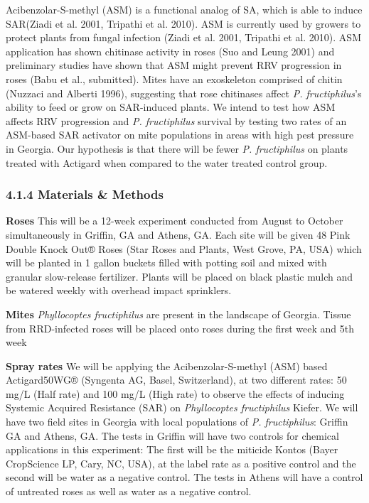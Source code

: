 \documentclass[12pt,final,CPage]{ufthesis}
\begin{document}
{  Acibenzolar-S-methyl (ASM) is a functional analog of SA, which is able to induce SAR(Ziadi et al. 2001, Tripathi et al. 2010). ASM is currently used by growers to protect plants from fungal infection (Ziadi et al. 2001, Tripathi et al. 2010). ASM application has shown chitinase activity in roses (Suo and Leung 2001) and preliminary studies have shown that ASM might prevent RRV progression in roses (Babu et al., submitted). Mites have an exoskeleton comprised of chitin (Nuzzaci and Alberti 1996), suggesting that rose chitinases affect \emph{P. fructiphilus}'s ability to feed or grow on SAR-induced plants. We intend to test how ASM affects RRV progression and \emph{P. fructiphilus} survival by testing two rates of an ASM-based SAR activator on mite populations in areas with high pest pressure in Georgia. Our hypothesis is that there will be fewer \emph{P. fructiphilus} on plants treated with Actigard when compared to the water treated control group.

  \hypertarget{materials-methods-3}{%
  \subsubsection{4.1.4 Materials \& Methods}\label{materials-methods-3}}

  \textbf{Roses}
  This will be a 12-week experiment conducted from August to October simultaneously in Griffin, GA and Athens, GA.
  Each site will be given 48 Pink Double Knock Out® Roses (Star Roses and Plants, West Grove, PA, USA) which will be planted in 1 gallon buckets filled with potting soil and mixed with granular slow-release fertilizer. Plants will be placed on black plastic mulch and be watered weekly with overhead impact sprinklers.

  \textbf{Mites}
  \emph{Phyllocoptes fructiphilus} are present in the landscape of Georgia. Tissue from RRD-infected roses will be placed onto roses during the first week and 5th week

  \textbf{Spray rates}
  We will be applying the Acibenzolar-S-methyl (ASM) based Actigard50WG® (Syngenta AG, Basel, Switzerland), at two different rates: 50 mg/L (Half rate) and 100 mg/L (High rate) to observe the effects of inducing Systemic Acquired Resistance (SAR) on \emph{Phyllocoptes fructiphilus} Kiefer. We will have two field sites in Georgia with local populations of \emph{P. fructiphilus}: Griffin GA and Athens, GA. The tests in Griffin will have two controls for chemical applications in this experiment: The first will be the miticide Kontos (Bayer CropScience LP, Cary, NC, USA), at the label rate as a positive control and the second will be water as a negative control. The tests in Athens will have a control of untreated roses as well as water as a negative control.

}
\end{document}
